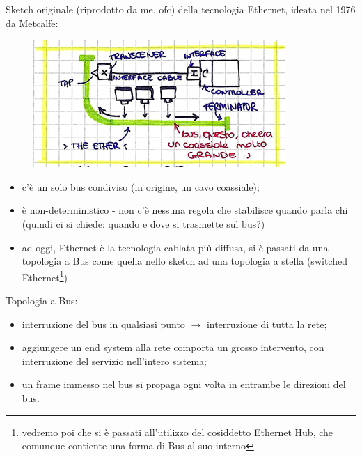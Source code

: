 \newpage
\noindent Sketch originale (riprodotto da me, ofc) della tecnologia Ethernet, ideata nel 1976 da Metcalfe:\\
\begin{figure}
 \begin{center}
 \includegraphics[width=1\linewidth]{Figures/05/ethernet1976.png}
  \end{center}
  \label{fig:eth1976}
\end{figure}

\begin{itemize}
    \item c'è un solo bus condiviso (in origine, un cavo coassiale);
    \item  è non-deterministico - non c'è nessuna regola che stabilisce quando parla chi (quindi ci si chiede: quando e dove si trasmette sul bus?)
    \item ad oggi, Ethernet è la tecnologia cablata più diffusa, si è passati da una topologia a Bus come quella nello sketch ad una topologia a stella (switched Ethernet\footnote{vedremo poi che si è passati all'utilizzo del cosiddetto Ethernet Hub, che comunque contiente una forma di Bus al suo interno})
\end{itemize}

\noindent Topologia a Bus:
\begin{itemize}
    \item 
interruzione del bus in qualsiasi punto $\rightarrow$ interruzione di tutta la rete;
\item aggiungere un end system alla rete comporta un grosso intervento, con interruzione del servizio nell'intero sistema;
\item un frame immesso nel bus si propaga ogni volta in entrambe le direzioni del bus.
\end{itemize}


